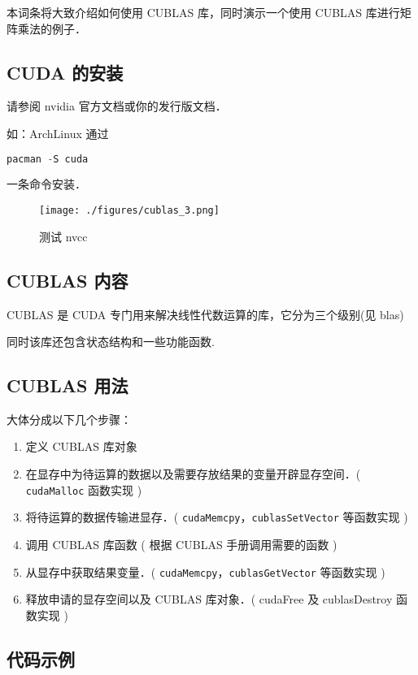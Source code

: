 
本词条将大致介绍如何使用 CUBLAS 库，同时演示一个使用 CUBLAS 库进行矩阵乘法的例子．
\subsection{CUDA 的安装}
请参阅 nvidia 官方文档或你的发行版文档．

如：ArchLinux 通过
\begin{lstlisting}[language=cpp]
pacman -S cuda
\end{lstlisting}
一条命令安装．

\begin{figure}[ht]
\centering
\texttt{[image: ./figures/cublas\_3.png]}
\caption{测试 nvcc} \label{cublas_fig3}
\end{figure}

\subsection{CUBLAS 内容}%

CUBLAS 是 CUDA 专门用来解决线性代数运算的库，它分为三个级别(见 blas)

同时该库还包含状态结构和一些功能函数.

\subsection{CUBLAS 用法}%

大体分成以下几个步骤：

\begin{enumerate}
  \item 定义 CUBLAS 库对象 
  \item  在显存中为待运算的数据以及需要存放结果的变量开辟显存空间．( \lstinline|cudaMalloc| 函数实现 )
  \item  将待运算的数据传输进显存．( \lstinline|cudaMemcpy|，\lstinline|cublasSetVector| 等函数实现 )
  \item 调用 CUBLAS 库函数 ( 根据 CUBLAS 手册调用需要的函数 )
  \item 从显存中获取结果变量．( \lstinline|cudaMemcpy|，\lstinline|cublasGetVector| 等函数实现 )
  \item  释放申请的显存空间以及 CUBLAS 库对象．( cudaFree 及 cublasDestroy 函数实现 )
\end{enumerate}

\subsection{代码示例}%

